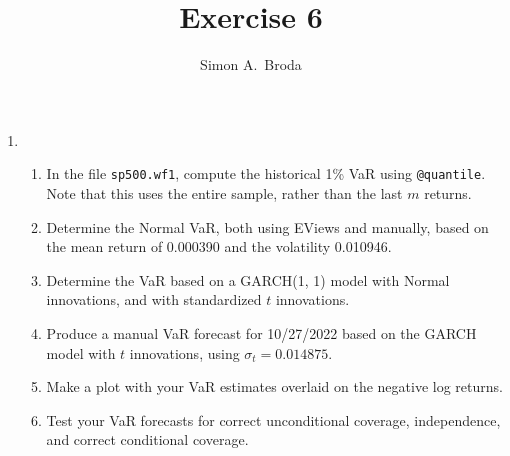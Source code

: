 \documentclass[11pt, a4paper]{article}
\begin{document}
\title{Exercise 6}
\author{Simon A.\ Broda}
\date{}
\maketitle

\begin{enumerate}

\item
\begin{enumerate}
\item In the file \texttt{sp500.wf1}, compute the historical 1\% VaR using \verb.@quantile.. Note that this uses the entire sample, rather than the last $m$ returns.
\item Determine the Normal VaR, both using EViews and manually, based on the mean return of 0.000390 and the volatility 0.010946.
\item Determine the VaR based on a GARCH(1, 1) model with Normal innovations, and with standardized $t$ innovations. 
\item Produce a manual VaR forecast for 10/27/2022 based on the GARCH model with $t$ innovations, using $\sigma_t=0.014875$.
\item Make a plot with your VaR estimates overlaid on the negative log returns.
\item Test your VaR forecasts for correct unconditional coverage, independence, and correct conditional coverage.
\end{enumerate}
\end{enumerate}
\end{document}
